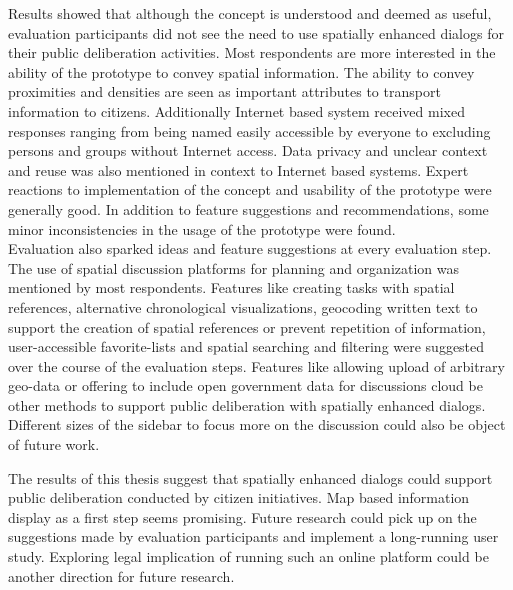 Results showed that although the concept is understood and deemed as useful, evaluation participants did not see the need to use spatially enhanced dialogs for their public deliberation activities. Most respondents are more interested in the ability of the prototype to convey spatial information. The ability to convey proximities and densities are seen as important attributes to transport information to citizens. Additionally Internet based system received mixed responses ranging from being named easily accessible by everyone to excluding persons and groups without Internet access. Data privacy and unclear context and reuse was also mentioned in context to Internet based systems. Expert reactions to implementation of the concept and usability of the prototype were generally good. In addition to feature suggestions and recommendations, some minor inconsistencies in the usage of the prototype were found.\\
Evaluation also sparked ideas and feature suggestions at every evaluation step. The use of spatial discussion platforms for planning and organization was mentioned by most respondents. Features like creating tasks with spatial references, alternative chronological visualizations, geocoding written text to support the creation of spatial references or prevent repetition of information, user-accessible favorite-lists and spatial searching and filtering were suggested over the course of the evaluation steps. Features like allowing upload of arbitrary geo-data or offering to include open government data for discussions cloud be other methods to support public deliberation with spatially enhanced dialogs. Different sizes of the sidebar to focus more on the discussion could also be object of future work.


The results of this thesis suggest that spatially enhanced dialogs could support public deliberation conducted by citizen initiatives. Map based information display as a first step seems promising. Future research could pick up on the suggestions made by evaluation participants and implement a long-running user study. Exploring legal implication of running such an online platform could be another direction for future research.
